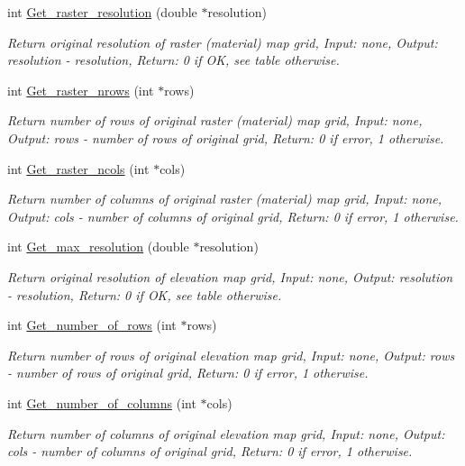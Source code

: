 \begin{CompactItemize}
int \hyperlink{GisApi_8C_a61}{Get\_\-raster\_\-resolution} (double $\ast$resolution)
\begin{CompactList}\small\item\em Return original resolution of raster (material) map grid, Input: none, Output: resolution - resolution, Return: 0 if OK, see table otherwise. \item\end{CompactList}\item 
int \hyperlink{GisApi_8C_a62}{Get\_\-raster\_\-nrows} (int $\ast$rows)
\begin{CompactList}\small\item\em Return number of rows of original raster (material) map grid, Input: none, Output: rows - number of rows of original grid, Return: 0 if error, 1 otherwise. \item\end{CompactList}\item 
int \hyperlink{GisApi_8C_a63}{Get\_\-raster\_\-ncols} (int $\ast$cols)
\begin{CompactList}\small\item\em Return number of columns of original raster (material) map grid, Input: none, Output: cols - number of columns of original grid, Return: 0 if error, 1 otherwise. \item\end{CompactList}\item 
int \hyperlink{GisApi_8C_a64}{Get\_\-max\_\-resolution} (double $\ast$resolution)
\begin{CompactList}\small\item\em Return original resolution of elevation map grid, Input: none, Output: resolution - resolution, Return: 0 if OK, see table otherwise. \item\end{CompactList}\item 
int \hyperlink{GisApi_8C_a65}{Get\_\-number\_\-of\_\-rows} (int $\ast$rows)
\begin{CompactList}\small\item\em Return number of rows of original elevation map grid, Input: none, Output: rows - number of rows of original grid, Return: 0 if error, 1 otherwise. \item\end{CompactList}\item 
int \hyperlink{GisApi_8C_a66}{Get\_\-number\_\-of\_\-columns} (int $\ast$cols)
\begin{CompactList}\small\item\em Return number of columns of original elevation map grid, Input: none, Output: cols - number of columns of original grid, Return: 0 if error, 1 otherwise. \item\end{CompactList}\item 

\end{CompactItemize}
